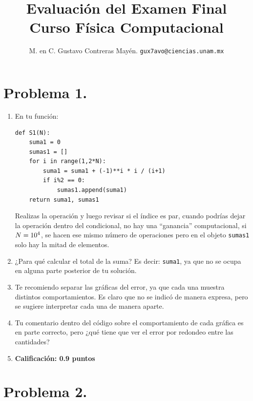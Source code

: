 
\usepackage{minted}

\author{M. en C. Gustavo Contreras Mayén. \texttt{gux7avo@ciencias.unam.mx}}
\title{Evaluación del Examen Final \\ {\large Curso Física Computacional}}
\date{ }


\maketitle
\fontsize{14}{14}\selectfont

\section{Problema 1.}
\begin{enumerate}
\item En tu función:
\begin{verbatim}
def S1(N):
    suma1 = 0
    sumas1 = []
    for i in range(1,2*N):
        suma1 = suma1 + (-1)**i * i / (i+1)
        if i%2 == 0:
            sumas1.append(suma1)
    return suma1, sumas1
\end{verbatim}
Realizas la operación y luego revisar si el índice es par, cuando podrías dejar la operación dentro del condicional, no hay una \enquote{ganancia} computacional, si $N = \num{d4}$, se hacen ese mismo número de operaciones pero en el objeto \texttt{sumas1} solo hay la mitad de elementos.
\item ¿Para qué calcular el total de la suma? Es decir: \texttt{suma1}, ya que no se ocupa en alguna parte posterior de tu solución.
\item Te recomiendo separar las gráficas del error, ya que cada una muestra distintos comportamientos. Es claro que no se indicó de manera expresa, pero se sugiere interpretar cada una de manera aparte.
\item Tu comentario dentro del código sobre el comportamiento de cada gráfica es en parte correcto, pero ¿qué tiene que ver el error por redondeo entre las cantidades?
\item \textbf{Calificación: 0.9 puntos}
\end{enumerate}

\section{Problema 2.}

